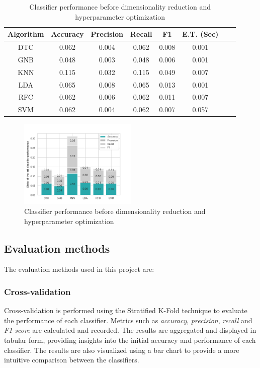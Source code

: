 	\begin{table}[H]
		\centering
		\begin{tabular}{|c|c|c|c|c|c|c|c|}
			\hline
				\textbf{Algorithm} &\textbf{Accuracy} &\textbf{Precision} &\textbf{Recall} &\textbf{F1} &\textbf{E.T. (Sec)} \\ \hline
				\hline
				DTC    & 0.062   & 0.004   & 0.062  & 0.008   & 0.001 \\ \hline
				GNB    & 0.048   & 0.003   & 0.048  & 0.006   & 0.001 \\ \hline
				KNN    & 0.115   & 0.032   & 0.115  & 0.049   & 0.007 \\ \hline
				LDA    & 0.065   & 0.008   & 0.065  & 0.013   & 0.001 \\ \hline
				RFC    & 0.062   & 0.006   & 0.062  & 0.011   & 0.007 \\ \hline
				SVM    & 0.062   & 0.004   & 0.062  & 0.007   & 0.057 \\				
			\hline
		\end{tabular}
		\caption{Classifier performance before dimensionality reduction and hyperparameter optimization}
		\label{tab:performance_before}
	\end{table}




	\begin{figure}[H]
		\centering
		\includegraphics[width=0.5\textwidth]{Plots/Performance_before.png}
		\caption{Classifier performance before dimensionality reduction and hyperparameter optimization}
		\label{fig:performance_before}
	\end{figure}

\subsection{Evaluation methods}
	The evaluation methods used in this project are:
	\subsubsection{Cross-validation}
		Cross-validation is performed using the Stratified K-Fold technique to evaluate the performance of each classifier. Metrics such as \emph{accuracy}, \emph{precision}, \emph{recall} and \emph{F1-score} are calculated and recorded. The results are aggregated and displayed in tabular form, providing insights into the initial accuracy and performance of each classifier. The results are also visualized using a bar chart to provide a more intuitive comparison between the classifiers. 
